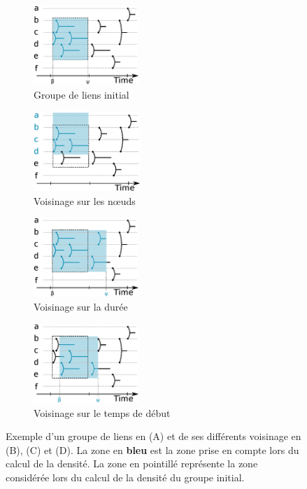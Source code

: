 \begin{figure}
\centering
	\begin{subfigure}{0.31\textwidth}
		\includegraphics[height=3cm]{img/GroupeDense/GroupExample/Voisinage/Base.eps}
		\caption{Groupe de liens initial}
	\end{subfigure}\hspace*{0.05cm}

	\begin{subfigure}{0.31\textwidth}
		\includegraphics[height=3cm]{img/GroupeDense/GroupExample/Voisinage/Variable_Nodes.eps}
		\caption{Voisinage sur les n\oe uds}
	\end{subfigure}\hspace*{0.02cm}
	\begin{subfigure}{0.31\textwidth}
		\includegraphics[height=3cm]{img/GroupeDense/GroupExample/Voisinage/Variable_duration.eps}
		\caption{Voisinage sur la durée}
	\end{subfigure}\hspace*{0.02cm}
	\begin{subfigure}{0.31\textwidth}
		\includegraphics[height=3cm]{img/GroupeDense/GroupExample/Voisinage/Variable_start.eps}
		\caption{Voisinage sur le temps de début}
	\end{subfigure}	
	\caption{Exemple d'un groupe de liens en (A) et de ses différents voisinage en (B), (C) et (D).
	La zone en \textcolor{bleu_transparent}{\textbf{bleu}} est la zone prise en compte lors du calcul de la densité.
	La zone en pointillé représente la zone considérée lors du calcul de la densité du groupe initial.
	}
	\label{fig:voisinage_groupe}
\end{figure}


